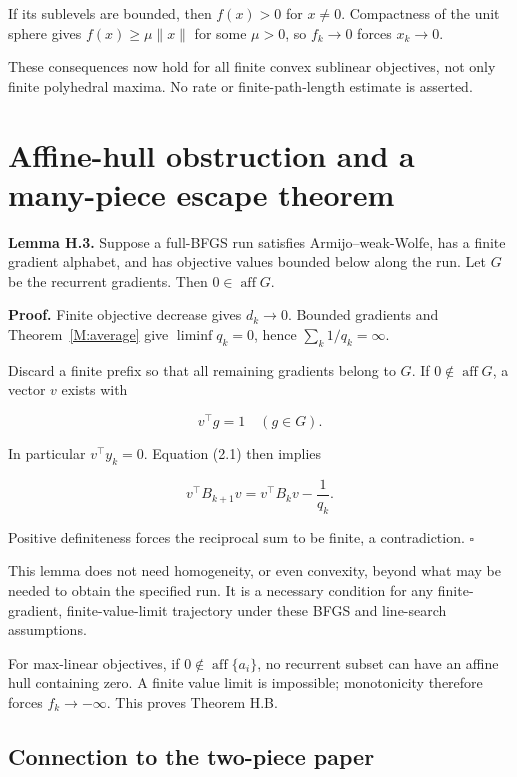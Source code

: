 If its sublevels are bounded, then \(f(x)>0\) for \(x\ne0\). Compactness
of the unit sphere gives \(f(x)\ge\mu\|x\|\) for some \(\mu>0\), so
\(f_k\to0\) forces \(x_k\to0\).

These consequences now hold for all finite convex sublinear objectives,
not only finite polyhedral maxima. No rate or finite-path-length
estimate is asserted.


\setcounter{section}{5}
\setcounter{theorem}{0}
\setcounter{lemma}{0}
\setcounter{corollary}{0}
\setcounter{proposition}{0}
\setcounter{remark}{0}
\setcounter{equation}{0}
\section{Affine-hull obstruction and a many-piece escape
theorem}\label{H:affine-hull-obstruction-and-a-many-piece-escape-theorem}

\textbf{Lemma H.3.} Suppose a full-BFGS run satisfies Armijo--weak-Wolfe,
has a finite gradient alphabet, and has objective values bounded below
along the run. Let \(G\) be the recurrent gradients. Then
\(0\in\operatorname{aff}G\).

\textbf{Proof.} Finite objective decrease gives \(d_k\to0\). Bounded
gradients and Theorem~\ref{M:average} give \(\liminf q_k=0\), hence
\(\sum_k1/q_k=\infty\).

Discard a finite prefix so that all remaining gradients belong to \(G\).
If \(0\notin\operatorname{aff}G\), a vector \(v\) exists with

\[
v^\top g=1\quad(g\in G).
\]

In particular \(v^\top y_k=0\). Equation (2.1) then implies

\[
v^\top B_{k+1}v=v^\top B_kv-\frac1{q_k}.
\]

Positive definiteness forces the reciprocal sum to be finite, a
contradiction. \(\square\)

This lemma does not need homogeneity, or even convexity, beyond what may
be needed to obtain the specified run. It is a necessary condition for
any finite-gradient, finite-value-limit trajectory under these BFGS and
line-search assumptions.

For max-linear objectives, if \(0\notin\operatorname{aff}\{a_i\}\), no
recurrent subset can have an affine hull containing zero. A finite value
limit is impossible; monotonicity therefore forces \(f_k\to-\infty\).
This proves Theorem H.B.

\subsection{Connection to the two-piece
paper}\label{H:connection-to-the-two-piece-paper}
